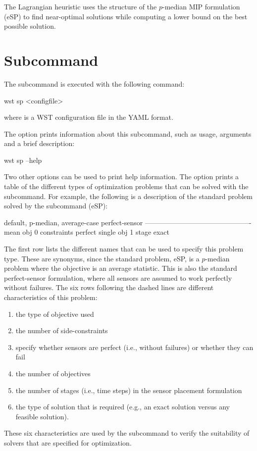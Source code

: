 
The Lagrangian heuristic uses the structure of the $p$-\/median MIP
formulation (eSP) to find near-optimal solutions while computing a
lower bound on the best possible solution.


\section{ Subcommand}

The  subcommand is executed with the following command:

\begin{unknownListing}
wst sp <configfile>
\end{unknownListing}

where  is a WST configuration file in the YAML format. 

The  option prints information about this subcommand, such as usage,
arguments and a brief description:

\begin{unknownListing}
wst sp --help
\end{unknownListing}

Two other options can be used to print help information. 
The  option prints a table of the different types of 
optimization problems that can be solved with the  subcommand. For example, 
the following is a description of the standard problem solved by the  subcommand (eSP):

\begin{unknownListing}
default, p-median, average-case perfect-sensor
---------------------------------------------- 
mean obj
0 constraints
perfect
single obj
1 stage
exact
\end{unknownListing}

The first row lists the different names that can be used to specify
this problem type. These are synonyms, since the standard problem,
eSP, is a $p$-\/median problem where the objective is an average statistic.
This is also the standard perfect-sensor formulation, where all
sensors are assumed to work perfectly without failures.
The six rows following the dashed lines are different characteristics of this problem: 
\begin{enumerate}
\item the type of objective used
\item the number of side-constraints
\item specify whether sensors are perfect (i.e., without failures) or whether they can fail
\item the number of objectives
\item the number of stages (i.e., time steps) in the sensor placement formulation
\item the type of solution that is required (e.g., an exact solution versus any feasible solution).
\end{enumerate}
These six characteristics are used by the  subcommand 
to verify the suitability of solvers that are specified for optimization.


